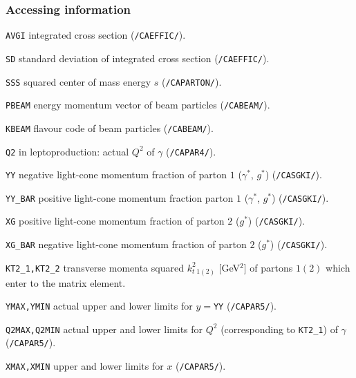 \documentclass[11pt]{article} \usepackage{mystyle-new}
\newcommand{\deflab}[1]{#1\hfil}%
\newenvironment{defl}[1]%
  {\begin{list}{}{\settowidth{\labelwidth}{#1}%
  \setlength{\leftmargin}{\labelwidth}%
  \addtolength{\leftmargin}{\labelsep}%
  \setlength{\itemsep}{0pt plus 1pt}
  \setlength{\parsep}{0pt plus 1pt}
  \setlength{\topsep}{0pt plus 1pt}
  \setlength{\partopsep}{0pt plus 1pt}
  \setlength{\parskip}{2mm plus 1mm minus 1mm}
  \let\makelabel\deflab}}%
  {\end{list}}
\begin{document}
\subsubsection{Accessing information}
\begin{defl}{123456789012345}
\item[ ]

\item[{\tt AVGI}]  integrated cross section ({\tt /CAEFFIC/}).
\item[{\tt SD}]  standard deviation of integrated cross section
                 ({\tt /CAEFFIC/}).
\item[ ]
\item[{\tt SSS}]  
squared center of mass energy  $s$ ({\tt /CAPARTON/}).
\item[{\tt PBEAM}]  energy momentum vector of beam particles
  ({\tt /CABEAM/}).
\item[{\tt KBEAM}]  flavour code of beam particles
 ({\tt /CABEAM/}).
\item[{\tt Q2}]  in leptoproduction: actual $Q^2$ of
                         $\gamma$ ({\tt /CAPAR4/}).
\item[{\tt YY}] 
negative light-cone momentum
                       fraction of parton $1$ ($\gamma^*$, $g^*$)
				({\tt /CASGKI/}).
\item[{\tt YY\_BAR}] 
positive light-cone momentum
                       fraction parton $1$ ($\gamma^*$, $g^*$)
				({\tt /CASGKI/}).
\item[{\tt XG}] 
positive light-cone momentum
                        fraction of parton $2$ ($g^*$) 
				({\tt /CASGKI/}).
\item[{\tt XG\_BAR}] 
negative light-cone momentum
                        fraction of parton $2$ ($g^*$)
				({\tt /CASGKI/}).
\item[{\tt KT2\_1,KT2\_2}]  transverse momenta squared
			$k_{t\;1(2)}^2$ [GeV$^2$] of partons 
 			$1(2)$ which enter to the matrix element.
\item[{\tt YMAX,YMIN}]  actual upper and lower limits for
			$y=$\verb+YY+ 
                          ({\tt /CAPAR5/}).
\item[{\tt Q2MAX,Q2MIN}]  actual upper and
                        lower limits for $Q^2$ (corresponding to \verb+KT2_1+)
				 of $\gamma$ ({\tt /CAPAR5/}).
\item[{\tt XMAX,XMIN}]  
upper and lower limits for $x$ ({\tt /CAPAR5/}).




\end{defl}
\end{document}
